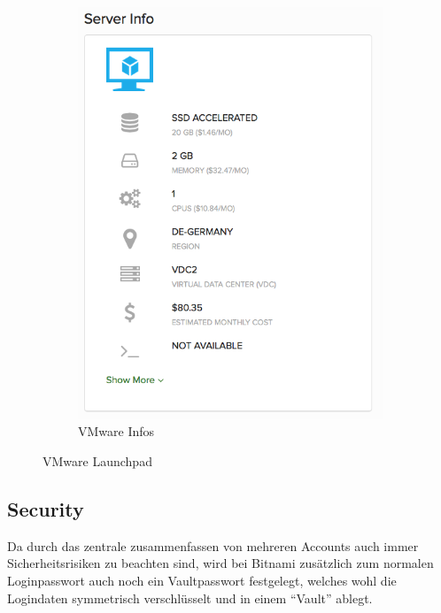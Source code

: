 \begin{figure}[!htbp]
\begin{subfigure}[b]{.39\textwidth}
\includegraphics[width=\textwidth]{./03_Analyse/03_Bitnami/images/vmware_infos}
\caption{VMware Infos}
\end{subfigure}
   \caption{VMware Launchpad}
\end{figure}


  \subsection{Security}
  Da durch das zentrale zusammenfassen von mehreren Accounts auch immer 
Sicherheitsrisiken zu beachten sind, wird bei Bitnami zusätzlich zum normalen 
Loginpasswort auch noch ein Vaultpasswort festgelegt, welches wohl die 
Logindaten symmetrisch verschlüsselt und in einem ``Vault'' ablegt.

